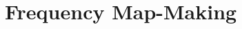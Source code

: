 \documentclass[../../thesis.tex]{subfiles}
\begin{document}
\chapter{Frequency Map-Making}

\minitoc
\end{document}
